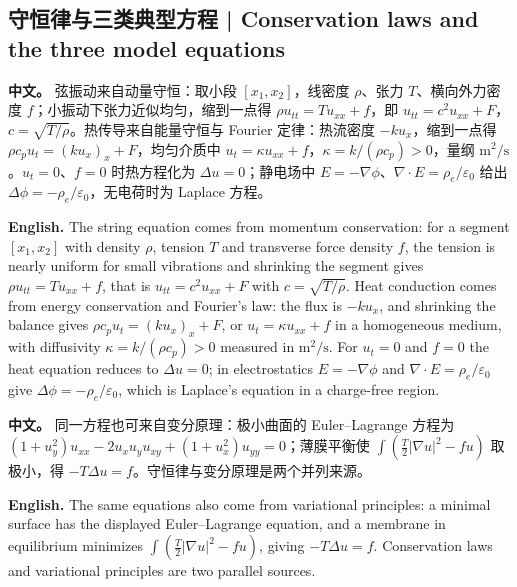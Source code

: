 \documentclass[UTF8,11pt,a4paper]{ctexart}
\newcommand{\APS}[2]{\par\noindent\textbf{中文。} #1\par\noindent\textbf{English.} #2\par\smallskip}
\begin{document}
\subsection{守恒律与三类典型方程 | Conservation laws and the three model equations}
\APS{弦振动来自动量守恒：取小段 $[x_1,x_2]$，线密度 $\rho$、张力 $T$、横向外力密度 $f$；小振动下张力近似均匀，缩到一点得 $\rho u_{tt}=Tu_{xx}+f$，即 $u_{tt}=c^2u_{xx}+F$，$c=\sqrt{T/\rho}$。热传导来自能量守恒与 Fourier 定律：热流密度 $-ku_x$，缩到一点得 $\rho c_pu_t=(ku_x)_x+F$，均匀介质中 $u_t=\kappa u_{xx}+f$，$\kappa=k/(\rho c_p)>0$，量纲 $\mathrm{m^2/s}$。$u_t=0$、$f=0$ 时热方程化为 $\Delta u=0$；静电场中 $E=-\nabla\phi$、$\nabla\cdot E=\rho_e/\varepsilon_0$ 给出 $\Delta\phi=-\rho_e/\varepsilon_0$，无电荷时为 Laplace 方程。}{The string equation comes from momentum conservation: for a segment $[x_1,x_2]$ with density $\rho$, tension $T$ and transverse force density $f$, the tension is nearly uniform for small vibrations and shrinking the segment gives $\rho u_{tt}=Tu_{xx}+f$, that is $u_{tt}=c^2u_{xx}+F$ with $c=\sqrt{T/\rho}$. Heat conduction comes from energy conservation and Fourier's law: the flux is $-ku_x$, and shrinking the balance gives $\rho c_pu_t=(ku_x)_x+F$, or $u_t=\kappa u_{xx}+f$ in a homogeneous medium, with diffusivity $\kappa=k/(\rho c_p)>0$ measured in $\mathrm{m^2/s}$. For $u_t=0$ and $f=0$ the heat equation reduces to $\Delta u=0$; in electrostatics $E=-\nabla\phi$ and $\nabla\cdot E=\rho_e/\varepsilon_0$ give $\Delta\phi=-\rho_e/\varepsilon_0$, which is Laplace's equation in a charge-free region.}
\APS{同一方程也可来自变分原理：极小曲面的 Euler--Lagrange 方程为 $(1+u_y^2)u_{xx}-2u_xu_yu_{xy}+(1+u_x^2)u_{yy}=0$；薄膜平衡使 $\int(\tfrac{T}{2}|\nabla u|^2-fu)$ 取极小，得 $-T\Delta u=f$。守恒律与变分原理是两个并列来源。}{The same equations also come from variational principles: a minimal surface has the displayed Euler--Lagrange equation, and a membrane in equilibrium minimizes $\int(\tfrac{T}{2}|\nabla u|^2-fu)$, giving $-T\Delta u=f$. Conservation laws and variational principles are two parallel sources.}
\end{document}
